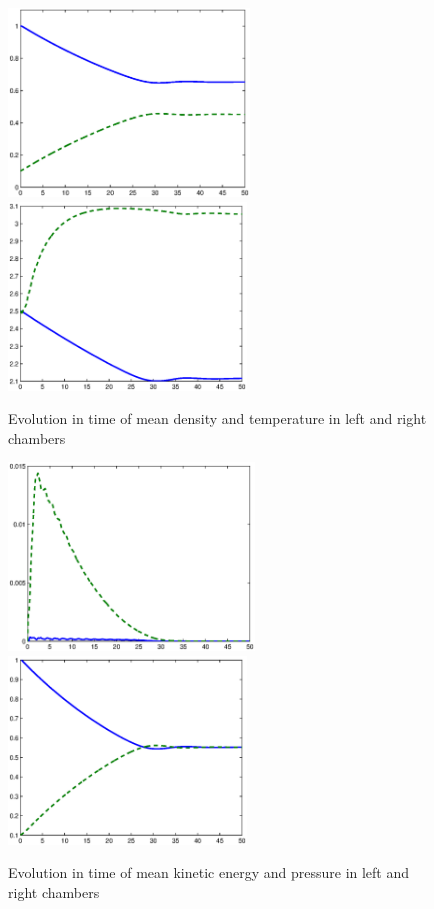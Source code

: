 \begin{figure}[bhpt] 
\centerline{ 
\includegraphics[height=5.0cm]
{chapters/hoffman-3/eps/Rho_2.eps}
\includegraphics[height=5.0cm]
{chapters/hoffman-3/eps/T_2.eps}
} 
\caption{Evolution in time of mean density and temperature in left and right
chambers}
\label{densitytemp} 
\end{figure}
\begin{figure}[bhpt] 
\centerline{ 
\includegraphics[height=5.0cm]
{chapters/hoffman-3/eps/K_2.eps}
\includegraphics[height=5.0cm]
{chapters/hoffman-3/eps/P_2.eps}
} 
\caption{Evolution in time of mean kinetic energy and pressure in left and right
chambers}
\label{kinenergypress} 
\end{figure}


